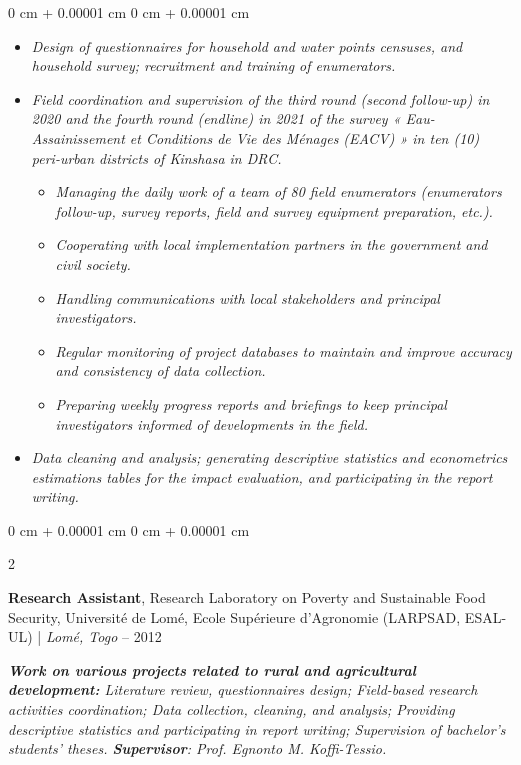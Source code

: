 \documentclass[10 pt, letterpaper]{article}
\newenvironment{highlights}{
    \begin{itemize}[
        topsep=0.10 cm,
        parsep=0.10 cm,
        partopsep=0pt,
        itemsep=0pt,
        leftmargin=0 cm + 10pt
    ]
}{
    \end{itemize}
} %
\newenvironment{onecolentry}{
    \begin{adjustwidth}{
        0 cm + 0.00001 cm
    }{
        0 cm + 0.00001 cm
    }
}{
    \end{adjustwidth}
} %
\newenvironment{twocolentry}[2][]{
    \onecolentry
    \def\secondColumn{#2}
    \setcolumnwidth{\fill, 4.5 cm}
    \begin{paracol}{2}
}{
    \switchcolumn \raggedleft \secondColumn
    \end{paracol}
    \endonecolentry
} %
\begin{document}
        \begin{onecolentry}
            \begin{highlights}
                \item \textit{Design of questionnaires for household and water points censuses, and household survey; recruitment and training of enumerators.}
                \item \textit{Field coordination and supervision of the third round (second follow-up) in 2020 and the fourth round (endline) in 2021 of the survey « Eau-Assainissement et Conditions de Vie des Ménages (EACV) » in ten (10) peri-urban districts of Kinshasa in DRC.}
            \begin{highlights}
                    \item \textit{Managing the daily work of a team of 80 field enumerators (enumerators follow-up, survey reports, field and survey equipment preparation, etc.).}
                    \item \textit{Cooperating with local implementation partners in the government and civil society.}
                    \item \textit{Handling communications with local stakeholders and principal investigators.}
                    \item \textit{Regular monitoring of project databases to maintain and improve accuracy and consistency of data collection.}
                    \item \textit{Preparing weekly progress reports and briefings to keep principal investigators informed of developments in the field.}
            \end{highlights}
                \item \textit{Data cleaning and analysis; generating descriptive statistics and econometrics estimations tables for the impact evaluation, and participating in the report writing.}
            \end{highlights}
        \end{onecolentry}
        \vspace{0.3 cm}

        \begin{twocolentry}{
            2010 – 2012
        }
        \textbf{Research Assistant}, Research Laboratory on Poverty and Sustainable Food Security, Université de Lomé, Ecole Supérieure d'Agronomie (LARPSAD, ESAL-UL) | \textit{Lomé, Togo} \end{twocolentry}
        \vspace{0.10 cm}
        \textit{\textbf{Work on various projects related to rural and agricultural development:} Literature review, questionnaires design; Field-based research activities coordination; Data collection, cleaning, and analysis; Providing descriptive statistics and participating in report writing; Supervision of bachelor's students' theses. \textbf{Supervisor}: Prof. Egnonto M. Koffi-Tessio.}
\end{document}
